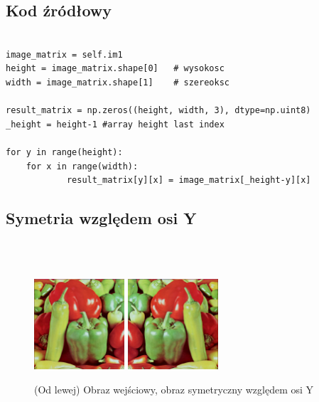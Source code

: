 \documentclass[final,a4paper,openany,12pt]{mwbk}
\begin{document}
\subsection*{Kod źródłowy}

\begin{lstlisting}[caption= Symetrie względem osi X]

image_matrix = self.im1
height = image_matrix.shape[0]   # wysokosc
width = image_matrix.shape[1]    # szereoksc

result_matrix = np.zeros((height, width, 3), dtype=np.uint8)
_height = height-1 #array height last index

for y in range(height):
    for x in range(width): 
            result_matrix[y][x] = image_matrix[_height-y][x]

\end{lstlisting}

\subsection*{ Symetria względem osi Y}

\hfill
\\\\
\indent

\begin{figure}[H]
	\begin{center}
		\includegraphics[width=0.3\textwidth]{1/1Geo_oy_Original}
		\includegraphics[width=0.3\textwidth]{1/1Geo_oy_Result}
	\end{center}
	\caption{(Od lewej) Obraz wejściowy, obraz symetryczny względem osi Y }
\end{figure}
\end{document}
